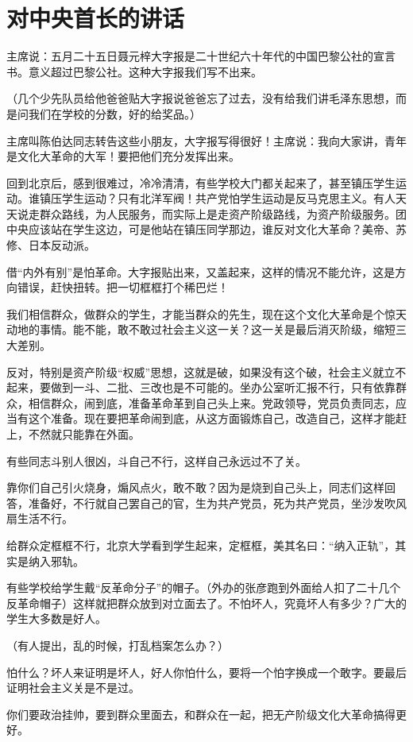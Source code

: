 \section[对中央首长的讲话（一九六六年七月）]{对中央首长的讲话}


主席说：五月二十五日聂元梓大字报是二十世纪六十年代的中国巴黎公社的宣言书。意义超过巴黎公社。这种大字报我们写不出来。

（几个少先队员给他爸爸贴大字报说爸爸忘了过去，没有给我们讲毛泽东思想，而是问我们在学校的分数，好的给奖品。）

主席叫陈伯达同志转告这些小朋友，大字报写得很好！主席说：我向大家讲，青年是文化大革命的大军！要把他们充分发挥出来。

回到北京后，感到很难过，冷冷清清，有些学校大门都关起来了，甚至镇压学生运动。谁镇压学生运动？只有北洋军阀！共产党怕学生运动是反马克思主义。有人天天说走群众路线，为人民服务，而实际上是走资产阶级路线，为资产阶级服务。团中央应该站在学生这边，可是他站在镇压同学那边，谁反对文化大革命？美帝、苏修、日本反动派。

借“内外有别”是怕革命。大字报贴出来，又盖起来，这样的情况不能允许，这是方向错误，赶快扭转。把一切框框打个稀巴烂！

我们相信群众，做群众的学生，才能当群众的先生，现在这个文化大革命是个惊天动地的事情。能不能，敢不敢过社会主义这一关？这一关是最后消灭阶级，缩短三大差别。

反对，特别是资产阶级“权威”思想，这就是破，如果没有这个破，社会主义就立不起来，要做到一斗、二批、三改也是不可能的。坐办公室听汇报不行，只有依靠群众，相信群众，闹到底，准备革命革到自己头上来。党政领导，党员负责同志，应当有这个准备。现在要把革命闹到底，从这方面锻炼自己，改造自己，这样才能赶上，不然就只能靠在外面。

有些同志斗别人很凶，斗自己不行，这样自己永远过不了关。

靠你们自己引火烧身，煽风点火，敢不敢？因为是烧到自己头上，同志们这样回答，准备好，不行就自己罢自己的官，生为共产党员，死为共产党员，坐沙发吹风扇生活不行。

给群众定框框不行，北京大学看到学生起来，定框框，美其名曰：“纳入正轨”，其实是纳入邪轨。

有些学校给学生戴“反革命分子”的帽子。（外办的张彦跑到外面给人扣了二十几个反革命帽子）这样就把群众放到对立面去了。不怕坏人，究竟坏人有多少？广大的学生大多数是好人。

（有人提出，乱的时候，打乱档案怎么办？）

怕什么？坏人来证明是坏人，好人你怕什么，要将一个怕字换成一个敢字。要最后证明社会主义关是不是过。

你们要政治挂帅，要到群众里面去，和群众在一起，把无产阶级文化大革命搞得更好。

